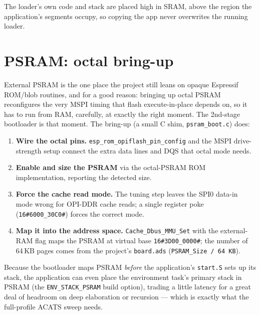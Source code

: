 The loader's own code and stack are placed high in SRAM, above the region the
application's segments occupy, so copying the app never overwrites the running
loader.

\section{PSRAM: octal bring-up}

External PSRAM is the one place the project still leans on opaque Espressif
ROM/blob routines, and for a good reason: bringing up octal PSRAM reconfigures
the very MSPI timing that flash execute-in-place depends on, so it has to run
from RAM, carefully, at exactly the right moment. The 2nd-stage bootloader is
that moment. The bring-up (a small C shim, \texttt{psram\_boot.c}) does:

\begin{enumerate}
\item \textbf{Wire the octal pins.} \texttt{esp\_rom\_opiflash\_pin\_config} and
  the MSPI drive-strength setup connect the extra data lines and DQS that octal
  mode needs.
\item \textbf{Enable and size the PSRAM} via the octal-PSRAM ROM implementation,
  reporting the detected size.
\item \textbf{Force the cache read mode.} The tuning step leaves the SPI0 data-in
  mode wrong for OPI-DDR cache reads; a single register poke
  (\texttt{16\#6000\_30C0\#}) forces the correct mode.
\item \textbf{Map it into the address space.} \texttt{Cache\_Dbus\_MMU\_Set} with
  the external-RAM flag maps the PSRAM at virtual base \texttt{16\#3D00\_0000\#}; the
  number of 64\,KB pages comes from the project's \texttt{board.ads}
  (\texttt{PSRAM\_Size / 64\,KB}).
\end{enumerate}

Because the bootloader maps PSRAM \emph{before} the application's \texttt{start.S}
sets up its stack, the application can even place the environment task's primary
stack in PSRAM (the \texttt{ENV\_STACK\_PSRAM} build option), trading a little
latency for a great deal of headroom on deep elaboration or recursion --- which
is exactly what the full-profile ACATS sweep needs.


